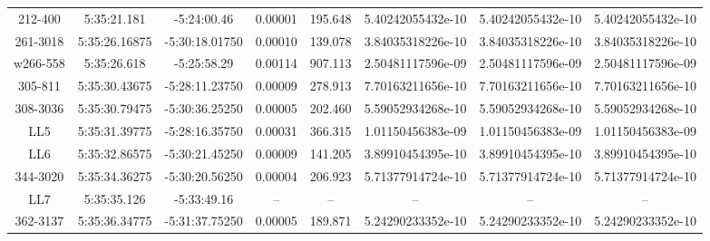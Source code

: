 \begin{table}
\begin{tabular}{cccccccc}
212-400 & 5:35:21.181 & -5:24:00.46 & 0.00001 & 195.648 & 5.40242055432e-10 & 5.40242055432e-10 & 5.40242055432e-10 \\
261-3018 & 5:35:26.16875 & -5:30:18.01750 & 0.00010 & 139.078 & 3.84035318226e-10 & 3.84035318226e-10 & 3.84035318226e-10 \\
w266-558 & 5:35:26.618 & -5:25:58.29 & 0.00114 & 907.113 & 2.50481117596e-09 & 2.50481117596e-09 & 2.50481117596e-09 \\
305-811 & 5:35:30.43675 & -5:28:11.23750 & 0.00009 & 278.913 & 7.70163211656e-10 & 7.70163211656e-10 & 7.70163211656e-10 \\
308-3036 & 5:35:30.79475 & -5:30:36.25250 & 0.00005 & 202.460 & 5.59052934268e-10 & 5.59052934268e-10 & 5.59052934268e-10 \\
LL5 & 5:35:31.39775 & -5:28:16.35750 & 0.00031 & 366.315 & 1.01150456383e-09 & 1.01150456383e-09 & 1.01150456383e-09 \\
LL6 & 5:35:32.86575 & -5:30:21.45250 & 0.00009 & 141.205 & 3.89910454395e-10 & 3.89910454395e-10 & 3.89910454395e-10 \\
344-3020 & 5:35:34.36275 & -5:30:20.56250 & 0.00004 & 206.923 & 5.71377914724e-10 & 5.71377914724e-10 & 5.71377914724e-10 \\
LL7 & 5:35:35.126 & -5:33:49.16 & -- & -- & -- & -- & -- \\
362-3137 & 5:35:36.34775 & -5:31:37.75250 & 0.00005 & 189.871 & 5.24290233352e-10 & 5.24290233352e-10 & 5.24290233352e-10 \\
\end{tabular}
\end{table}
